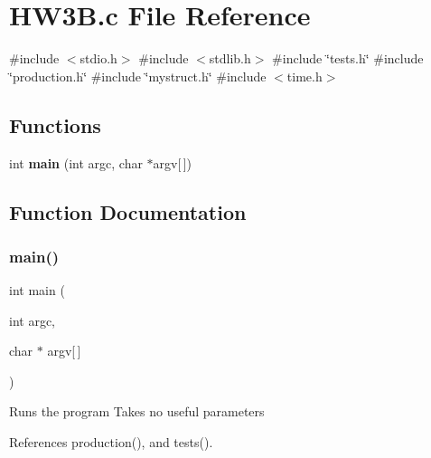 \section{H\+W3\+B.\+c File Reference}
\label{HW3B_8c}
{\ttfamily \#include $<$stdio.\+h$>$}\newline
{\ttfamily \#include $<$stdlib.\+h$>$}\newline
{\ttfamily \#include \char`\"{}tests.\+h\char`\"{}}\newline
{\ttfamily \#include \char`\"{}production.\+h\char`\"{}}\newline
{\ttfamily \#include \char`\"{}mystruct.\+h\char`\"{}}\newline
{\ttfamily \#include $<$time.\+h$>$}\newline
\subsection*{Functions}
\begin{DoxyCompactItemize}
\item 
int \textbf{ main} (int argc, char $\ast$argv[$\,$])
\end{DoxyCompactItemize}


\subsection{Function Documentation}
\mbox{\label{HW3B_8c_a0ddf1224851353fc92bfbff6f499fa97}} 
\subsubsection{main()}
{\footnotesize\ttfamily int main (\begin{DoxyParamCaption}\item[{int}]{argc,  }\item[{char $\ast$}]{argv[$\,$] }\end{DoxyParamCaption})}

Runs the program Takes no useful parameters 

References production(), and tests().

